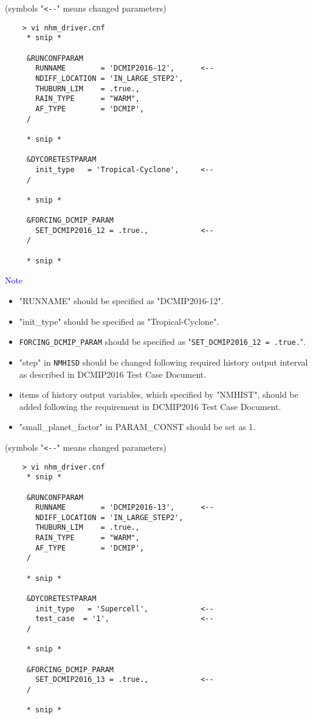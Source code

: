  \vspace{0.5cm}

 (symbols "\verb|<--|" means changed parameters)
 \begin{verbatim}
    > vi nhm_driver.cnf
     * snip *

     &RUNCONFPARAM
       RUNNAME        = 'DCMIP2016-12',      <--
       NDIFF_LOCATION = 'IN_LARGE_STEP2',
       THUBURN_LIM    = .true.,
       RAIN_TYPE      = "WARM",
       AF_TYPE        = 'DCMIP',
     /

     * snip *

     &DYCORETESTPARAM
       init_type   = 'Tropical-Cyclone',     <--
     /

     * snip *

     &FORCING_DCMIP_PARAM
       SET_DCMIP2016_12 = .true.,            <--
     /

     * snip *
 \end{verbatim}

 \noindent \textcolor{blue}{{\sf Note}}
 \begin{itemize}
   \item "RUNNAME" should be specified as "DCMIP2016-12".
   \item "init\_type" should be specified as "Tropical-Cyclone".
   \item \verb|FORCING_DCMIP_PARAM| should be specified as "\verb|SET_DCMIP2016_12 = .true.|".
   \item "step" in \verb|NMHISD| should be changed following required history output interval
           as described in DCMIP2016 Test Case Document.
   \item items of history output variables, which specified by "NMHIST", should be added
         following the requirement in DCMIP2016 Test Case Document.
   \item "small\_planet\_factor" in PARAM\_CONST should be set as 1.
 \end{itemize}

 \vspace{0.5cm}

 (symbols "\verb|<--|" means changed parameters)
 \begin{verbatim}
    > vi nhm_driver.cnf
     * snip *

     &RUNCONFPARAM
       RUNNAME        = 'DCMIP2016-13',      <--
       NDIFF_LOCATION = 'IN_LARGE_STEP2',
       THUBURN_LIM    = .true.,
       RAIN_TYPE      = "WARM",
       AF_TYPE        = 'DCMIP',
     /

     * snip *

     &DYCORETESTPARAM
       init_type   = 'Supercell',            <--
       test_case  = '1',                     <--
     /

     * snip *

     &FORCING_DCMIP_PARAM
       SET_DCMIP2016_13 = .true.,            <--
     /

     * snip *
 \end{verbatim}


